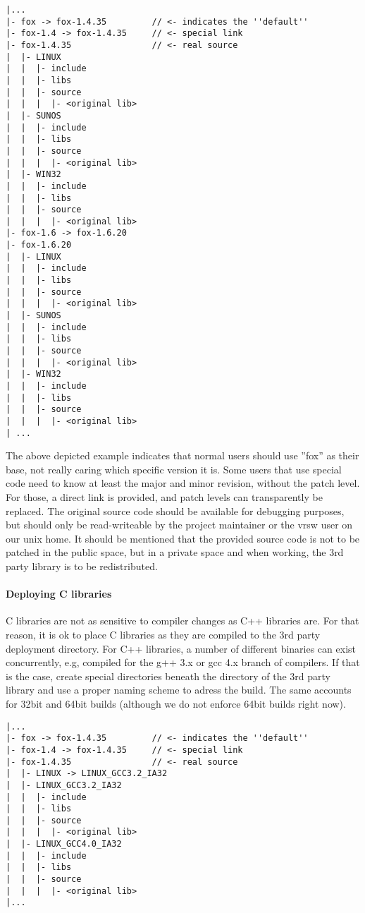 \begin{verbatim}
|...
|- fox -> fox-1.4.35         // <- indicates the ''default''
|- fox-1.4 -> fox-1.4.35     // <- special link 
|- fox-1.4.35                // <- real source
|  |- LINUX
|  |  |- include
|  |  |- libs
|  |  |- source
|  |  |  |- <original lib>
|  |- SUNOS
|  |  |- include
|  |  |- libs
|  |  |- source
|  |  |  |- <original lib>
|  |- WIN32
|  |  |- include
|  |  |- libs
|  |  |- source
|  |  |  |- <original lib>
|- fox-1.6 -> fox-1.6.20
|- fox-1.6.20
|  |- LINUX
|  |  |- include
|  |  |- libs
|  |  |- source
|  |  |  |- <original lib>
|  |- SUNOS
|  |  |- include
|  |  |- libs
|  |  |- source
|  |  |  |- <original lib>
|  |- WIN32
|  |  |- include
|  |  |- libs
|  |  |- source
|  |  |  |- <original lib>
| ...
\end{verbatim}
The above depicted example indicates that normal users should use ''fox'' as their base, not really caring which specific version it is.
Some users that use special code need to know at least the major and minor revision, without the patch level.
For those, a direct link is provided, and patch levels can transparently be replaced.
The original source code should be available for debugging purposes, but should only be read-writeable by the project maintainer or the vrsw user on our unix home.
It should be mentioned that the provided source code is not to be patched in the public space, but in a private space and when working, the 3rd party library is to be redistributed.
\paragraph{Deploying C libraries}
C libraries are not as sensitive to compiler changes as C++ libraries are.
For that reason, it is ok to place C libraries as they are compiled to the 3rd party deployment  directory.
For C++ libraries, a number of different binaries can exist concurrently, e.g, compiled for the g++ 3.x or gcc 4.x branch of compilers.
If that is the case, create special directories beneath the  directory of the 3rd party library and use a proper naming scheme to adress the build.
The same accounts for 32bit and 64bit builds (although we do not enforce 64bit builds right now).
\begin{verbatim}
|...
|- fox -> fox-1.4.35         // <- indicates the ''default''
|- fox-1.4 -> fox-1.4.35     // <- special link 
|- fox-1.4.35                // <- real source
|  |- LINUX -> LINUX_GCC3.2_IA32
|  |- LINUX_GCC3.2_IA32
|  |  |- include
|  |  |- libs
|  |  |- source
|  |  |  |- <original lib>
|  |- LINUX_GCC4.0_IA32
|  |  |- include
|  |  |- libs
|  |  |- source
|  |  |  |- <original lib>
|...
\end{verbatim}

